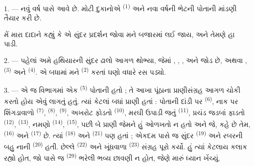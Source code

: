 %

\VUsaut{4.0mm}
\VUsaut{2.0mm}
\VUsaut{3.4mm}

1. --- નવું વર્ષ પાસે આવે છે. મોટી દુકાનોએ 
\textsuperscript{(1)} અને નવા વર્ષની ભેટની પોતાની માંડણી તૈયાર કરી છે.

મેં મારા દાદાને કહ્યું કે એ સુંદર પ્રદર્શન જોવા મને બજારમાં લઈ જાય,
અને તેમણે હા પાડી.

2. --- પહેલાં અમે હથિયારની સુંદર ઢાલો આગળ થોભ્યા, જેમાં
, , ,
 અને  જોડ છે, અથવા
,  \textsuperscript{(3)} અને
 \textsuperscript{(4)}. એ બધામાં મને
 \textsuperscript{(2)} કરતાં ઘણો વધારે રસ પડ્યો.

\VUsaut{3.0mm}
\VUsaut{2.6mm}

3. --- એ જ વિભાગમાં એક  \textsuperscript{(5)}
પોતાની  હતો ; તે આખા પૂંઠાના પ્રાણીસંગ્રહ આગળ
ચોકી કરતો હોય એવું લાગતું હતું. ત્યાં કેટલાં બધાં પ્રાણી હતાં :
પોતાની દાંડી પર  \textsuperscript{(6)}, નાક પર શિંગડાવાળો
 \textsuperscript{(7)}, 
\textsuperscript{(8)},  \textsuperscript{(9)}, અખરોટ
ફોડતો  \textsuperscript{(10)}, મરઘી ઉપાડી જતું
 \textsuperscript{(11)}, પ્રચંડ જડબાં ફાડતો
 \textsuperscript{(12)},  \textsuperscript{(13)},
નમણો  \textsuperscript{(14)}, 
\textsuperscript{(15)}, પછી બે પ્રાણી જેમને હું ઓળખતો ન હતો અને જે,
કહે છે તેમ,  \textsuperscript{(16)} અને 
\textsuperscript{(17)} છે. ત્યાં  \textsuperscript{(18)}
અને  \textsuperscript{(21)} પણ હતાં ; એકદમ પાસે જ સુંદર
 \textsuperscript{(19)} અને રબરની બહુ નાની
 \textsuperscript{(20)} હતી. છેલ્લે
 \textsuperscript{(22)} અને ખૂંધવાળા  \textsuperscript{(23)} સંગ્રહ પૂરો કર્યો. હું ત્યાં
કેટલાય કલાક રહ્યો હોત, જો પાસે જ 
\textsuperscript{(29)} ભરેલી ભવ્ય છાવણી ન હોત, જેણે મારું ધ્યાન ખેંચ્યું.

